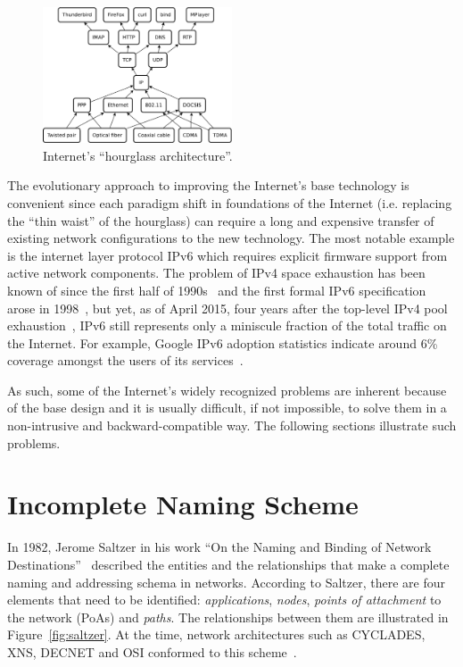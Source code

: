     \begin{figure}[H]
        \begin{center}
            \includegraphics[width=0.5\textwidth]{fig/problems_hourglass.pdf}
          \caption{Internet's ``hourglass architecture''.}
          \label{fig:inet_hourglass}
        \end{center}
    \end{figure}


    The evolutionary approach to improving the Internet's base technology is convenient since each paradigm shift in foundations of the Internet (i.e. replacing the ``thin waist'' of the hourglass) can require a long and expensive transfer of existing network configurations to the new technology. The most notable example is the internet layer protocol IPv6 which requires explicit firmware support from active network components. The problem of IPv4 space exhaustion has been known of since the first half of 1990s~\cite{rfc1631} and the first formal IPv6 specification arose in 1998~\cite{rfc2460}, but yet, as of April 2015, four years after the top-level IPv4 pool exhaustion~\cite{ipv4_exhaustion}, IPv6 still represents only a miniscule fraction of the total traffic on the Internet. For example, Google IPv6 adoption statistics indicate around 6\% coverage amongst the users of its services~\cite{ipv6stats}.

    As such, some of the Internet's widely recognized problems are inherent because of the base design and it is usually difficult, if not impossible, to solve them in a non-intrusive and backward-compatible way. The following sections illustrate such problems.

    \section{Incomplete Naming Scheme}\label{problems:naming}

        In 1982, Jerome Saltzer in his work ``On the Naming and Binding of Network Destinations''~\cite{rfc1498} described the entities and the relationships that make a complete naming and addressing schema in networks. According to Saltzer, there are four elements that need to be identified: \emph{applications}, \emph{nodes}, \emph{points of attachment} to the network (PoAs) and \emph{paths}. The relationships between them are illustrated in Figure~\ref{fig:saltzer}. At the time, network architectures such as CYCLADES, XNS, DECNET and OSI conformed to this scheme~\cite{internet_demo}.

